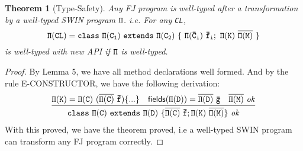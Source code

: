 \documentclass[letterpaper]{article}
\newtheorem{theorem}{Theorem}
\begin{document}
\begin{theorem}[Type-Safety]
Any FJ program is well-typed after a transformation by a well-typed SWIN program $\tt \Pi$. 
i.e. For any \verb|CL|,
 $$\tt \Pi(CL)= class\ \Pi(C_1)\ extends\ \Pi(C_2)\ \{\ \Pi(\bar{C}_i)\ \bar{f}_i;\ \Pi(K)\  \overline{\Pi(M)}\ \}$$
is well-typed with new API if $\tt \Pi$ is well-typed.
\end{theorem}

\begin{proof}
By Lemma 5, we have all method declarations well formed. And by the rule E-CONSTRUCTOR, we have the following derivation:
\[
  \begin{array}{ccc}
    \infer
    {\tt class~\Pi(C)~extends~\Pi(D)~\{\overline{\Pi(C)}~\bar{f};\Pi(K)~\overline{\Pi(M)}\} ~ \mathit{ok}}
    {\tt \Pi(K)=\Pi(C)~(\overline{\Pi(C)}~\bar{f})\{...\}
    &\tt \mathsf{fields}(\Pi(D))=\overline{\Pi(D)}~\bar{g}
    &\tt \overline{\Pi(M)}~\mathit{ok}}
  \end{array}
\]
With this proved, we have the theorem proved, i.e a well-typed SWIN program can transform any FJ program correctly.
\end{proof}
\end{document}
